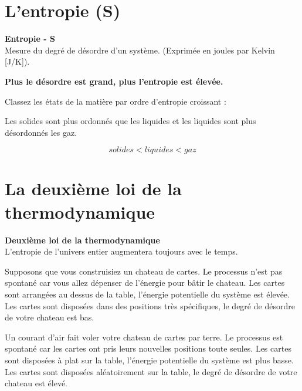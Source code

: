 \documentclass[
  11pt,
  french,
  a4paper,
  openany]{book}
\begin{document}
\hypertarget{lentropie-s}{%
\section{L'entropie (S)}\label{lentropie-s}}

\begin{tcolorbox}
\textbf{Entropie - S}\\
Mesure du degré de désordre d'un système. (Exprimée en joules par Kelvin {[}J/K{]}).

\end{tcolorbox}

\textbf{Plus le désordre est grand, plus l'entropie est élevée.}

\begin{Exercise}

Classez les états de la matière par ordre d'entropie croissant :



\end{Exercise}

\begin{Answer}
Les solides sont plus ordonnés que les liquides et les liquides sont plus désordonnés les gaz.

\[
solides < liquides < gaz
\]

\end{Answer}

\hypertarget{la-deuxiuxe8me-loi-de-la-thermodynamique}{%
\section{La deuxième loi de la thermodynamique}\label{la-deuxiuxe8me-loi-de-la-thermodynamique}}

\begin{tcolorbox}
\textbf{Deuxième loi de la thermodynamique}\\
L'entropie de l'univers entier augmentera toujours avec le temps.

\end{tcolorbox}

Supposons que vous construisiez un chateau de cartes. Le processus n'est pas spontané car vous allez dépenser de l'énergie pour bâtir le chateau. Les cartes sont arrangées au dessus de la table, l'énergie potentielle du système est élevée. Les cartes sont disposées dans des positions très spécifiques, le degré de désordre de votre chateau est bas.

Un courant d'air fait voler votre chateau de cartes par terre. Le processus est spontané car les cartes ont pris leurs nouvelles positions toute seules. Les cartes sont disposées à plat sur la table, l'énergie potentielle du système est plus basse. Les cartes sont disposées aléatoirement sur la table, le degré de désordre de votre chateau est élevé.
\end{document}
